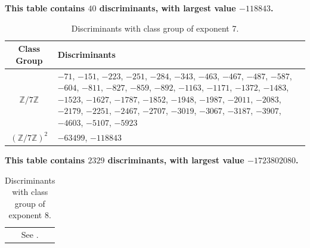 \documentclass[11pt,letterpaper,reqno]{amsart}
\numberwithin{equation}{section}
\numberwithin{figure}{section}
\numberwithin{table}{section}
\newcommand{\ZZ}{\mathbb{Z}}
\begin{document}
\begin{table}[H]
\caption{Discriminants with class group of exponent 7.}
\begin{center}
\textbf{This table contains $40$ discriminants, with largest value $-118843$. \\ \vspace{2mm}}
\begin{tabular}{ c | p{125mm} } 
    \label{table:CMexp7}
    Class Group & Discriminants \\ 
    \hline
    $\ZZ/7\ZZ$ & $-71$, $-151$, $-223$, $-251$, $-284$, $-343$, $-463$, $-467$, $-487$, $-587$, $-604$, $-811$, $-827$, $-859$, $-892$, $-1163$, $-1171$, $-1372$, $-1483$, $-1523$, $-1627$, $-1787$, $-1852$, $-1948$, $-1987$, $-2011$, $-2083$, $-2179$, $-2251$, $-2467$, $-2707$, $-3019$, $-3067$, $-3187$, $-3907$, $-4603$, $-5107$, $-5923$ \\
    \hline
    $(\ZZ/7\ZZ)^{2}$ & $-63499$, $-118843$ \\
    \hline
\end{tabular}
\end{center}
\end{table}


\begin{table}[H]
\caption{Discriminants with class group of exponent 8.}
\begin{center}
\textbf{This table contains $2329$ discriminants, with largest value $-1723802080$. \\ \vspace{2mm}}
\begin{tabular}{  c }
    \label{table:CMexp8}
    See \cite[Table 8]{ross-code}. 
\end{tabular}
\end{center}
\end{table}















\end{document}
